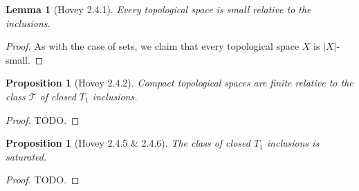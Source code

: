 \documentclass{amsart}
\theoremstyle{plain}
\newtheorem{proposition}[theorem]{Proposition}
\newtheorem{lemma}[theorem]{Lemma}
\theoremstyle{definition}
\newcommand{\0}{\mathbf{0}}
\newcommand{\cT}{\mathcal T}
\renewcommand{\(}{\left(}
\renewcommand{\)}{\right)}
\begin{document}
\begin{lemma}[Hovey 2.4.1]\label{2.4.1}
  Every topological space is small relative to the inclusions.
\end{lemma}
\begin{proof}
  As with the case of sets, we claim that every topological space $X$ is $|X|$-small. 
\end{proof}

\begin{proposition}[Hovey 2.4.2]\label{2.4.2}
  Compact topological spaces are finite relative to the class $\cT$ of closed $T_1$ inclusions.
\end{proposition}
\begin{proof}
  \color{red}TODO.
\end{proof}

\begin{proposition}[Hovey 2.4.5 \& 2.4.6]\label{2.4.5-6}
  The class of closed $T_1$ inclusions is saturated.
\end{proposition}
\begin{proof}
  \color{red}TODO.
\end{proof}
\end{document}
